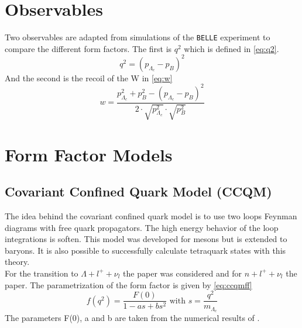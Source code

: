 \section{Observables}
Two observables are adapted from simulations of the \texttt{BELLE} experiment 
to compare the different form factors.
The first is \(q^2\) which is defined in {\eqref{eq:q2}}.
\begin{equation}
  q^2 = \left( p_{\Lambda_c} - p_B \right)^2 \label{eq:q2}
\end{equation}
And the second is the recoil of the W in {\eqref{eq:w}}
\begin{equation}
  w = \frac{p^2_{\Lambda_c} +  p^2_B - \left( p_{\Lambda_c} - p_B \right)^2}
  {2 \cdot \sqrt{p^2_{\Lambda_c}} \cdot \sqrt{p^2_B}} \label{eq:w}
\end{equation}

\section{Form Factor Models}
\subsection{Covariant Confined Quark Model (CCQM)}
The idea behind the covariant confined quark model is to use two loops 
Feynman diagrams with free quark propagators. The high energy behavior of 
the loop integrations is soften. This model was developed for mesons but 
is extended to baryons. It is also possible to successfully calculate tetraquark 
states with this theory.\\
For the transition to \(\Lambda + l^+ + \nu_l\) the paper{\cite{CCQM_L}} was 
considered and for \(n + l^+ + \nu_l\) the paper{\cite{CCQM_N}}.
The parametrization of the form factor is given by {\eqref{eq:ccqmff}}
\begin{equation}
  f(q^2) = \frac{F(0)}{1 - a s + b s^2} \text{ with } s = \frac{q^2}{m_{\Lambda_c}} \label{eq:ccqmff}
\end{equation}
The parameters F(0), a and b are taken from the numerical results of {\cite{CCQM_L}}.


